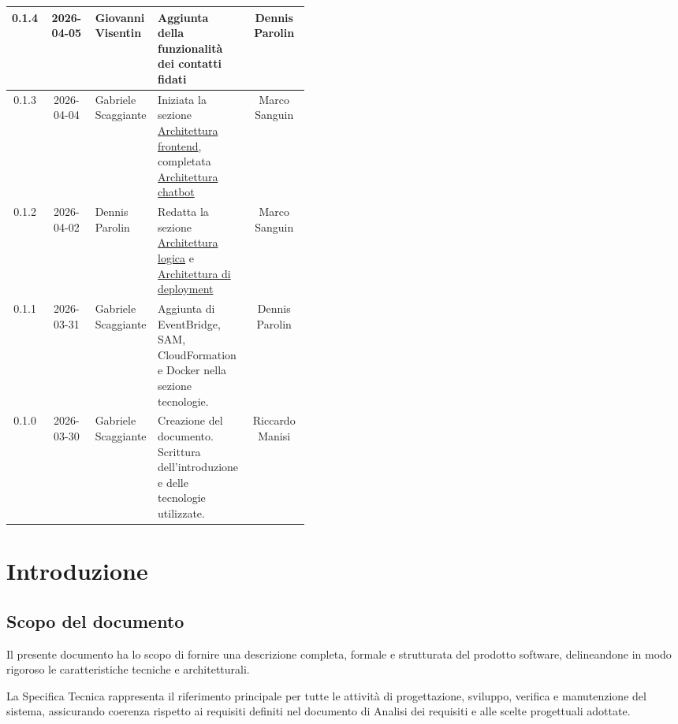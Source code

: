 \documentclass[a4paper,12pt]{article}
\begin{document}
\begin{center}
\begin{longtable}{|c|c|>{\raggedright\arraybackslash}p{0.21\linewidth}|>{\raggedright\arraybackslash}p{0.23\linewidth}|c|}
\hline
0.1.4 & 2026-04-05 & Giovanni Visentin & Aggiunta della funzionalità dei contatti fidati & Dennis Parolin \\
\hline
0.1.3 & 2026-04-04 & Gabriele Scaggiante & Iniziata la sezione \hyperref[subsec:architettura_frontend]{Architettura frontend}, completata \hyperref[subsubsec:architettura_chatbot_frontend]{Architettura chatbot} & Marco Sanguin \\
\hline
0.1.2 & 2026-04-02 & Dennis Parolin & Redatta la sezione \hyperref[subsec:architettura_logica]{Architettura logica} e \hyperref[subsec:architettura_deployment]{Architettura di deployment} & Marco Sanguin \\
\hline
0.1.1 & 2026-03-31 & Gabriele Scaggiante & Aggiunta di EventBridge, SAM, CloudFormation e Docker nella sezione tecnologie. & Dennis Parolin \\
\hline
0.1.0 & 2026-03-30 & Gabriele Scaggiante & Creazione del documento. Scrittura dell'introduzione e delle tecnologie utilizzate. & Riccardo Manisi \\
\hline

\end{longtable}
\end{center}
\endgroup

\clearpage

\tableofcontents
\thispagestyle{empty}

\clearpage

\listoftables

\listoffigures

\clearpage


\section{Introduzione}
\subsection{Scopo del documento} \label{sec:scopo_documento}
Il presente documento ha lo scopo di fornire una descrizione completa, formale e strutturata del prodotto software, delineandone in modo rigoroso le caratteristiche tecniche e architetturali.

La Specifica Tecnica rappresenta il riferimento principale per tutte le attività di progettazione, sviluppo, verifica e manutenzione del sistema, assicurando coerenza rispetto ai requisiti definiti nel documento di Analisi dei requisiti e alle scelte progettuali adottate.
\end{document}
